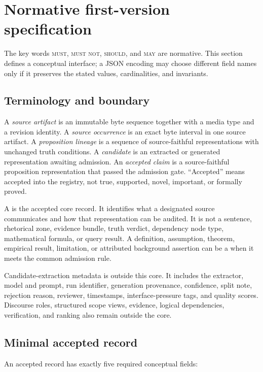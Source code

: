 \section{Normative first-version specification}\label{sec:normative}

The key words \textsc{must}, \textsc{must not}, \textsc{should}, and \textsc{may} are normative. This section defines a conceptual interface; a JSON encoding may choose different field names only if it preserves the stated values, cardinalities, and invariants.

\subsection{Terminology and boundary}

A \emph{source artifact} is an immutable byte sequence together with a media type and a revision identity. A \emph{source occurrence} is an exact byte interval in one source artifact. A \emph{proposition lineage} is a sequence of source-faithful representations with unchanged truth conditions. A \emph{candidate} is an extracted or generated representation awaiting admission. An \emph{accepted claim} is a source-faithful proposition representation that passed the admission gate. ``Accepted'' means accepted into the registry, not true, supported, novel, important, or formally proved.

A \ScientificClaim{} is the accepted core record. It identifies what a designated source communicates and how that representation can be audited. It is not a sentence, rhetorical zone, evidence bundle, truth verdict, dependency node type, mathematical formula, or query result. A definition, assumption, theorem, empirical result, limitation, or attributed background assertion can be a \ScientificClaim{} when it meets the common admission rule.

Candidate-extraction metadata is outside this core. It includes the extractor, model and prompt, run identifier, generation provenance, confidence, split note, rejection reason, reviewer, timestamps, interface-pressure tags, and quality scores. Discourse roles, structured scope views, evidence, logical dependencies, verification, and ranking also remain outside the core.

\subsection{Minimal accepted record}

An accepted record has exactly five required conceptual fields:

